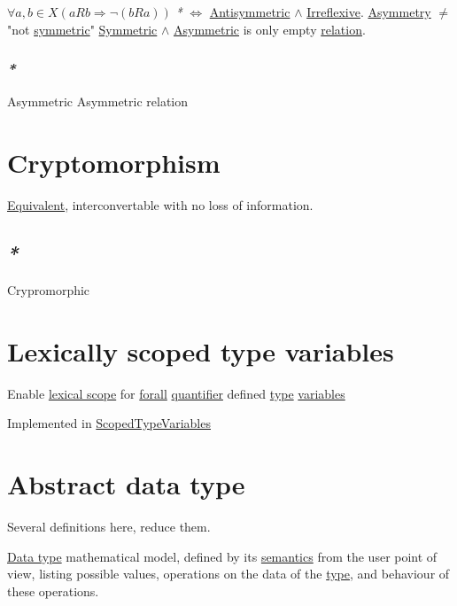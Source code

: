 \documentclass[a4paper,14pt,oneside]{book}
\begin{document}
\(\forall a,b \in X (aRb \Rightarrow \neg (bRa))\)
\emph{*} \(\iff\) \hyperref[org3227878]{Antisymmetric} \(\land\) \hyperref[orgaf41fcd]{Irreflexive}.
\hyperref[org1fd16ec]{Asymmetry} \(\ne\) "not \hyperref[org0617847]{symmetric}"
\hyperref[org0617847]{Symmetric} \(\land\) \hyperref[org25df0ae]{Asymmetric} is only empty \hyperref[org5b7e58d]{relation}.

\subsection{\emph{*}}
\label{sec:org016a46a}

\label{org25df0ae}Asymmetric
\label{org93d047a}Asymmetric relation

\chapter{\label{org14134f9}Cryptomorphism}
\label{sec:org832c072}

\hyperref[org005d293]{Equivalent}, interconvertable with no loss of information.

\section{\emph{*}}
\label{sec:org34c685b}

\label{org0609084}Crypromorphic

\chapter{\label{org57ea7e7}Lexically scoped type variables}
\label{sec:orgd55c92e}

Enable \hyperref[org30cf8d1]{lexical scope} for \hyperref[orgb7ccf2a]{forall} \hyperref[orgb06cf41]{quantifier} defined \hyperref[orgaa4a18b]{type} \hyperref[org70949da]{variables}

Implemented in \hyperref[orgc8babe5]{ScopedTypeVariables}

\chapter{\label{orgc716a32}Abstract data type}
\label{sec:org6ca91ce}

Several definitions here, reduce them.

\hyperref[org4473799]{Data type} mathematical model, defined by its \hyperref[org4de3f61]{semantics} from the user point of view, listing possible values, operations on the data of the \hyperref[orgaa4a18b]{type}, and behaviour of these operations.
\end{document}
